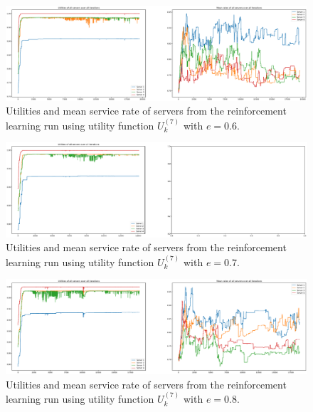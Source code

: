 \begin{figure}[H]
    \includegraphics[width=\textwidth]{chapters/00_appendix/03_more_rl_results/Bin/utility_7_eps/u7_1_e06.eps}
    \caption{Utilities and mean service rate of servers from the reinforcement
    learning run using utility function \(U_k^{(7)}\) with \(e = 0.6\).}
    \label{fig:RL_utility7_1_e06}
\end{figure}

\begin{figure}[H]
    \includegraphics[width=\textwidth]{chapters/00_appendix/03_more_rl_results/Bin/utility_7_eps/u7_1_e07.eps}
    \caption{Utilities and mean service rate of servers from the reinforcement
    learning run using utility function \(U_k^{(7)}\) with \(e = 0.7\).}
    \label{fig:RL_utility7_1_e07}
\end{figure}

\begin{figure}[H]
    \includegraphics[width=\textwidth]{chapters/00_appendix/03_more_rl_results/Bin/utility_7_eps/u7_1_e08.eps}
    \caption{Utilities and mean service rate of servers from the reinforcement
    learning run using utility function \(U_k^{(7)}\) with \(e = 0.8\).}
    \label{fig:RL_utility7_1_e08}
\end{figure}

